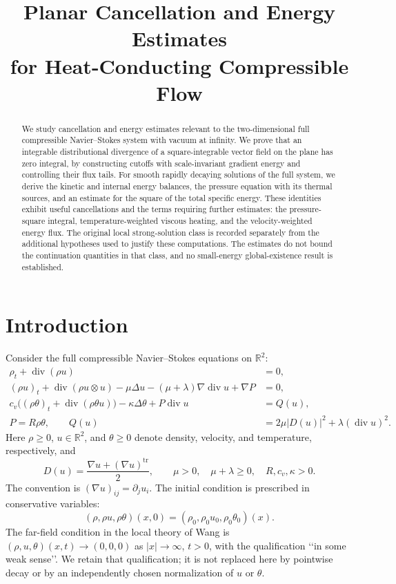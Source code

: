 \documentclass[10pt,twoside]{article}
\title{Planar Cancellation and Energy Estimates\\
for Heat-Conducting Compressible Flow}
\author{}
\date{}
\newcommand{\R}{\mathbb R}
\newcommand{\Div}{\operatorname{div}}
\begin{document}
\maketitle
\begin{abstract}
We study cancellation and energy estimates relevant to the two-dimensional
full compressible Navier--Stokes system with vacuum at infinity.
We prove that an integrable distributional divergence of a square-integrable
vector field on the plane has zero integral, by constructing cutoffs with
scale-invariant gradient energy and controlling their flux tails.
For smooth rapidly decaying solutions of the full system, we derive the
kinetic and internal energy balances, the pressure equation with its thermal
sources, and an estimate for the square of the total specific energy.
These identities exhibit useful cancellations and the terms requiring
further estimates: the pressure-square integral, temperature-weighted viscous
heating, and the velocity-weighted energy flux.
The original local strong-solution class is recorded separately from the
additional hypotheses used to justify these computations.
The estimates do not bound the continuation quantities in that class,
and no small-energy global-existence result is established.
\end{abstract}

\section{Introduction}
Consider the full compressible Navier--Stokes equations on $\R^2$:
\begin{align}
 \rho_t+\Div(\rho u)&=0, \label{eq:mass}\\
 (\rho u)_t+\Div(\rho u\otimes u)
 -\mu\Delta u-(\mu+\lambda)\nabla\Div u+\nabla P&=0,
 \label{eq:momentum}\\
 c_v\bigl((\rho\theta)_t+\Div(\rho\theta u)\bigr)
 -\kappa\Delta\theta+P\Div u&=Q(u), \label{eq:heat}\\
 P=R\rho\theta,\qquad
 Q(u)&=2\mu|D(u)|^2+\lambda(\Div u)^2. \label{eq:constitutive}
\end{align}
Here $\rho\ge0$, $u\in\R^2$, and $\theta\ge0$ denote density, velocity,
and temperature, respectively, and
\begin{equation}\label{eq:coefficients}
 D(u)=\frac{\nabla u+(\nabla u)^{\mathrm{tr}}}{2},\qquad
 \mu>0,\quad \mu+\lambda\ge0,\quad R,c_v,\kappa>0.
\end{equation}
The convention is $(\nabla u)_{ij}=\partial_j u_i$.
The initial condition is prescribed in conservative variables:
\begin{equation}\label{eq:initial}
 (\rho,\rho u,\rho\theta)(x,0)
   =(\rho_0,\rho_0u_0,\rho_0\theta_0)(x).
\end{equation}
The far-field condition in the local theory of Wang \cite{Wang} is
$(\rho,u,\theta)(x,t)\to(0,0,0)$ as $|x|\to\infty$, $t>0$, with the
qualification \lq\lq in some weak sense\rq\rq.
We retain that qualification; it is not replaced here by pointwise decay
or by an independently chosen normalization of $u$ or $\theta$.
\end{document}
